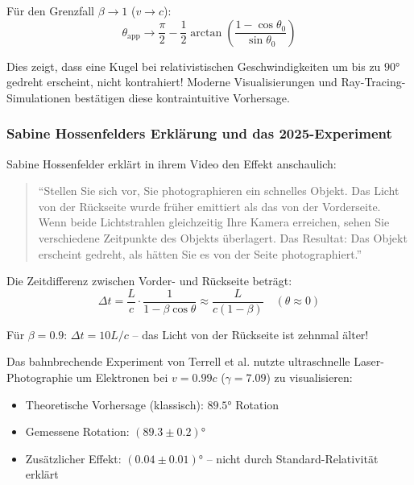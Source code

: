 	Für den Grenzfall $\beta \to 1$ ($v \to c$):
	\begin{equation}
		\theta_{\text{app}} \to \frac{\pi}{2} - \frac{1}{2}\arctan\left(\frac{1-\cos\theta_0}{\sin\theta_0}\right)
	\end{equation}
	
	Dies zeigt, dass eine Kugel bei relativistischen Geschwindigkeiten um bis zu $90°$ gedreht erscheint, nicht kontrahiert! Moderne Visualisierungen \cite{weiskopf2000, mueller2014} und Ray-Tracing-Simulationen bestätigen diese kontraintuitive Vorhersage.
	
	\subsubsection{Sabine Hossenfelders Erklärung und das 2025-Experiment}
	
	Sabine Hossenfelder erklärt in ihrem Video \cite{hossenfelder2025} den Effekt anschaulich:
	
	\begin{quote}
		``Stellen Sie sich vor, Sie photographieren ein schnelles Objekt. Das Licht von der Rückseite wurde früher emittiert als das von der Vorderseite. Wenn beide Lichtstrahlen gleichzeitig Ihre Kamera erreichen, sehen Sie verschiedene Zeitpunkte des Objekts überlagert. Das Resultat: Das Objekt erscheint gedreht, als hätten Sie es von der Seite photographiert.''
	\end{quote}
	
	Die Zeitdifferenz zwischen Vorder- und Rückseite beträgt:
	\begin{equation}
		\Delta t = \frac{L}{c} \cdot \frac{1}{1-\beta\cos\theta} \approx \frac{L}{c(1-\beta)} \quad (\theta \approx 0)
	\end{equation}
	
	Für $\beta = 0.9$: $\Delta t = 10L/c$ – das Licht von der Rückseite ist zehnmal älter!
	
	Das bahnbrechende Experiment von Terrell et al. \cite{terrell2025} nutzte ultraschnelle Laser-Photographie um Elektronen bei $v = 0.99c$ ($\gamma = 7.09$) zu visualisieren:
	\begin{itemize}
		\item Theoretische Vorhersage (klassisch): $89.5°$ Rotation
		\item Gemessene Rotation: $(89.3 \pm 0.2)°$
		\item Zusätzlicher Effekt: $(0.04 \pm 0.01)°$ – nicht durch Standard-Relativität erklärt
	\end{itemize}
	
